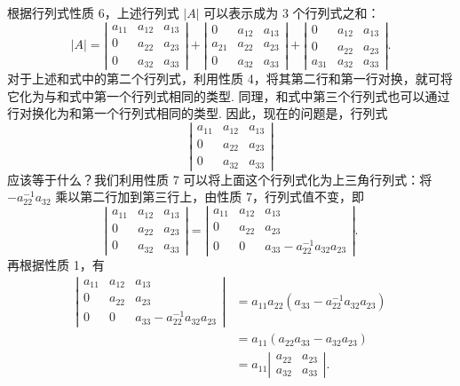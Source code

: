 \documentclass[UTF8, 12pt, fontset=fandol, oneside]{ctexart}
\begin{document}
根据行列式性质 6，上述行列式 $|A|$ 可以表示成为 3 个行列式之和：
\[
|A|=
\left|\begin{array}{ccc}
a_{11} & a_{12} & a_{13}\\
0 & a_{22} & a_{23}\\
0 & a_{32} & a_{33}
\end{array}\right|
+
\left|\begin{array}{ccc}
0 & a_{12} & a_{13}\\
a_{21} & a_{22} & a_{23}\\
0 & a_{32} & a_{33}
\end{array}\right|
+
\left|\begin{array}{ccc}
0 & a_{12} & a_{13}\\
0 & a_{22} & a_{23}\\
a_{31} & a_{32} & a_{33}
\end{array}\right|.
\]
对于上述和式中的第二个行列式，利用性质 4，将其第二行和第一行对换，就可将它化为与和式中第一个行列式相同的类型. 同理，和式中第三个行列式也可以通过行对换化为和第一个行列式相同的类型. 因此，现在的问题是，行列式
\[
\left|\begin{array}{ccc}
a_{11} & a_{12} & a_{13}\\
0 & a_{22} & a_{23}\\
0 & a_{32} & a_{33}
\end{array}\right|
\]
应该等于什么？我们利用性质 7 可以将上面这个行列式化为上三角行列式：将 $-a_{22}^{-1}a_{32}$ 乘以第二行加到第三行上，由性质 7，行列式值不变，即
\[
\left|\begin{array}{ccc}
a_{11} & a_{12} & a_{13}\\
0 & a_{22} & a_{23}\\
0 & a_{32} & a_{33}
\end{array}\right|
=
\left|\begin{array}{ccc}
a_{11} & a_{12} & a_{13}\\
0 & a_{22} & a_{23}\\
0 & 0 & a_{33}-a_{22}^{-1}a_{32}a_{23}
\end{array}\right|.
\]
再根据性质 1，有
\[
\begin{aligned}
\left|\begin{array}{ccc}
a_{11} & a_{12} & a_{13}\\
0 & a_{22} & a_{23}\\
0 & 0 & a_{33}-a_{22}^{-1}a_{32}a_{23}
\end{array}\right|
&=a_{11}a_{22}(a_{33}-a_{22}^{-1}a_{32}a_{23})\\
&=a_{11}(a_{22}a_{33}-a_{32}a_{23})\\
&=a_{11}
\left|\begin{array}{cc}
a_{22} & a_{23}\\
a_{32} & a_{33}
\end{array}\right|.
\end{aligned}
\]
\end{document}
